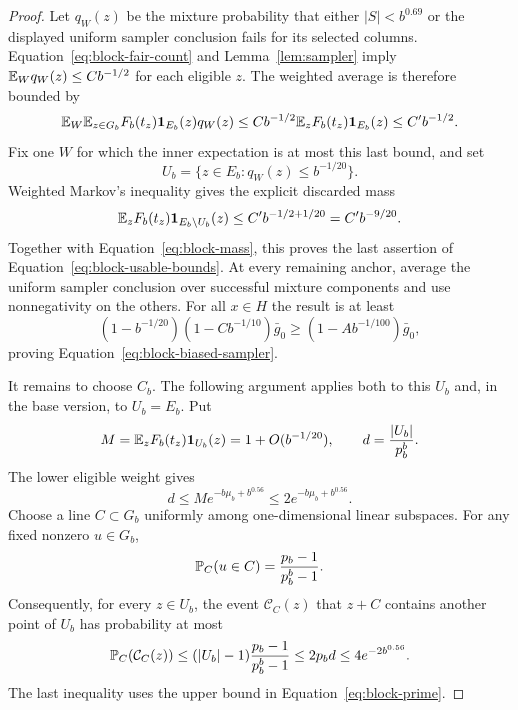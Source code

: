 \begin{proof}
Let $q_W(z)$ be the mixture probability that either $|S|<b^{0.69}$ or
the displayed uniform sampler conclusion fails for its selected columns.
Equation~\eqref{eq:block-fair-count} and Lemma~\ref{lem:sampler} imply
$\mathbb E_W q_W(z)\le Cb^{-1/2}$ for each eligible $z$.  The weighted average
is therefore bounded by
\[
 \mathbb E_W\mathbb E_{z\in G_b}
       F_b(t_z)\mathbf 1_{E_b}(z)q_W(z)
       \le Cb^{-1/2}\mathbb E_zF_b(t_z)\mathbf 1_{E_b}(z)
       \le C' b^{-1/2}.
\]
Fix one $W$ for which the inner expectation is at most this last bound,
and set
\[
 U_b=\{z\in E_b:q_W(z)\le b^{-1/20}\}.
\]
Weighted Markov's inequality gives the explicit discarded mass
\begin{equation}
 \mathbb E_zF_b(t_z)\mathbf 1_{E_b\setminus U_b}(z)
       \le C' b^{-1/2+1/20}=C'b^{-9/20}.
 \label{eq:block-discarded-mass}
\end{equation}
Together with Equation~\eqref{eq:block-mass}, this proves the last
assertion of Equation~\eqref{eq:block-usable-bounds}.  At every remaining
anchor, average the uniform sampler conclusion over successful mixture
components and use nonnegativity on the others.  For all $x\in H$ the
result is at least
\[
 (1-b^{-1/20})(1-Cb^{-1/10})\bar g_0
       \ge(1-A b^{-1/100})\bar g_0,
\]
proving Equation~\eqref{eq:block-biased-sampler}.

It remains to choose $C_b$.  The following argument applies both to this
$U_b$ and, in the base version, to $U_b=E_b$.  Put
\[
 M=\mathbb E_zF_b(t_z)\mathbf 1_{U_b}(z)=1+O(b^{-1/20}),\qquad
 d=\frac{|U_b|}{p_b^b}.
\]
The lower eligible weight gives
\begin{equation}
 d\le M e^{-b\mu_b+b^{0.56}}
       \le2e^{-b\mu_b+b^{0.56}}.
 \label{eq:block-sparse-density}
\end{equation}
Choose a line $C\subset G_b$ uniformly among one-dimensional linear
subspaces.  For any fixed nonzero $u\in G_b$,
\[
 \mathbb P_C(u\in C)=\frac{p_b-1}{p_b^b-1}.
\]
Consequently, for every $z\in U_b$, the event $\mathcal C_C(z)$ that
$z+C$ contains another point of $U_b$ has probability at most
\begin{equation}
 \mathbb P_C(\mathcal C_C(z))
       \le(|U_b|-1)\frac{p_b-1}{p_b^b-1}
       \le2p_b d\le4e^{-2b^{0.56}}.
 \label{eq:block-collision-probability}
\end{equation}
The last inequality uses the upper bound in
Equation~\eqref{eq:block-prime}.


\end{proof}
